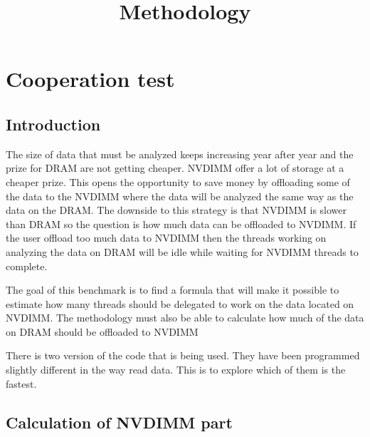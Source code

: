 \documentclass[12pt,a4paper,USenglish]{article}      %
\title{Methodology}  %
\begin{document}
\section{Cooperation test}
\subsection{Introduction}
The size of data that must be analyzed keeps increasing year after year and the prize for DRAM are not getting cheaper. NVDIMM offer a lot of storage at a cheaper prize. This opens the opportunity to save money by offloading some of the data to the NVDIMM where the data will be analyzed the same way as the data on the DRAM. The downside to this strategy is that NVDIMM is slower than DRAM so the question is how much data can be offloaded to NVDIMM. If the user offload too much data to NVDIMM then the threads working on analyzing the data on DRAM will be idle while waiting for NVDIMM threads to complete.

The goal of this benchmark is to find a formula that will make it possible to estimate how many threads should be delegated to work on the data located on NVDIMM. The methodology must also be able to calculate how much of the data on DRAM should be offloaded to NVDIMM

There is two version of the code that is being used. They have been programmed slightly different in the way read data. This is to explore which of them is the fastest.


\subsection{Calculation of NVDIMM part}
\end{document}
